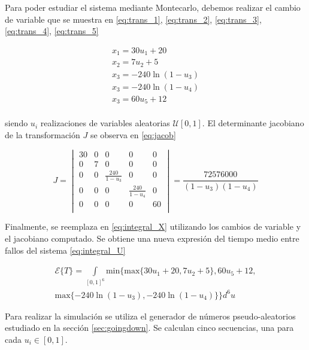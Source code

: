 \documentclass{sig-alternate}
\begin{document}
Para poder estudiar el sistema mediante Montecarlo, debemos realizar el cambio
de variable que se muestra en \eqref{eq:trans_1}, \eqref{eq:trans_2},
\eqref{eq:trans_3}, \eqref{eq:trans_4}, \eqref{eq:trans_5}

\begin{eqnarray}
	\label{eq:trans_1}
	x_1 = 30 u_1 + 20 \\
	\label{eq:trans_2}
	x_2 = 7 u_2 + 5 \\
	\label{eq:trans_3}
	x_3 = - 240 \ln (1 - u_3) \\
	\label{eq:trans_4}
	x_3 = - 240 \ln (1 - u_4) \\
	\label{eq:trans_5}
	x_3 = 60 u_5 + 12 \\
\end{eqnarray}

siendo $u_i$ realizaciones de variables aleatorias $\mathcal{U}[0,1]$.
El determinante jacobiano de la transformaci\'on $J$ se observa en \eqref{eq:jacob}

\begin{equation}
\label{eq:jacob}
J =
\begin{vmatrix}
  30 & 0 & 0 & 0 & 0 \\
  0 & 7 & 0 & 0 & 0 \\
  0 & 0 & \frac{240}{1 - u_3} & 0 & 0 \\
  0 & 0 & 0 & \frac{240}{1 - u_4} & 0 \\
  0 & 0 & 0 & 0 & 60 \\
\end{vmatrix}
=
\frac {72576000}{(1 - u_3)(1 - u_4)}
\end{equation}

Finalmente, se reemplaza en \eqref{eq:integral_X} utilizando los cambios
de variable y el jacobiano computado. Se obtiene una nueva expresi\'on
del tiempo medio entre fallos del sistema \eqref{eq:integral_U}

\begin{eqnarray}
\label{eq:integral_U}
\mathcal{E} \{ T \} =	\int\limits_{[0,1]^6} \mathrm{min} 
\{ \mathrm{max}\{ 30 u_1 + 20, 7 u_2 + 5\} , 60 u_5 + 12,
\nonumber
\\
\mathrm{max}\{ -240 \ln ( 1 - u_3 ) , -240 \ln ( 1 - u_4 ) \} \} d^6u
\end{eqnarray}

Para realizar la simulaci\'on se utiliza el generador de n\'umeros
pseudo-aleatorios estudiado en la secci\'on \ref{sec:goingdown}. Se calculan
cinco secuencias, una para cada $u_i \in [0,1]$.
\end{document}
